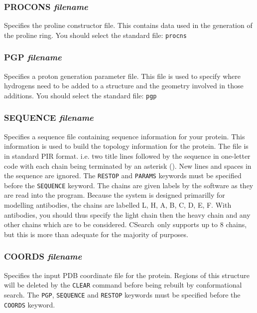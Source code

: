 \documentclass{report}
\newcommand{\cs}{CSearch}
\newcommand{\es}{\relax}
\begin{document}
\subsubsection{PROCONS {\em filename}}
\es
Specifies the proline constructor file. This contains data used in the
generation of the proline ring. You should select the standard file:
{\tt procns}

\subsubsection{PGP {\em filename}}
\es
Specifies a proton generation parameter file. This file is used to specify
where hydrogens need to be added to a structure and the geometry involved
in those additions. You should select the standard file: {\tt pgp}

\subsubsection{SEQUENCE {\em filename}}
\es
Specifies a sequence file containing sequence information for your protein.
This information is used to build the topology information for the protein.
The file is in standard PIR format. i.e. two title lines followed by the
sequence in one-letter code with each chain being terminated by an asterisk
({\tt *}). New lines and spaces in the sequence are ignored. The {\tt RESTOP}
and {\tt PARAMS} keywords must be specified before the {\tt SEQUENCE} keyword.
The chains are given labels by the software as they are read into the 
program. Because the system is designed primarilly for modelling antibodies,
the chains are labelled L, H, A, B, C, D, E, F. With antibodies, you should
thus specify the light chain then the heavy chain and any other chains
which are to be considered. \cs\ only supports up to
8 chains, but this is more than adequate for the majority of purposes.

\subsubsection{COORDS {\em filename}}
\label{sec:coords}
\es
Specifies the input PDB coordinate file for the protein. Regions of this
structure will be deleted by the {\tt CLEAR} command before being rebuilt by
conformational search. The {\tt PGP}, {\tt SEQUENCE} and {\tt RESTOP}
keywords must be specified before the {\tt COORDS} keyword.
\end{document}
